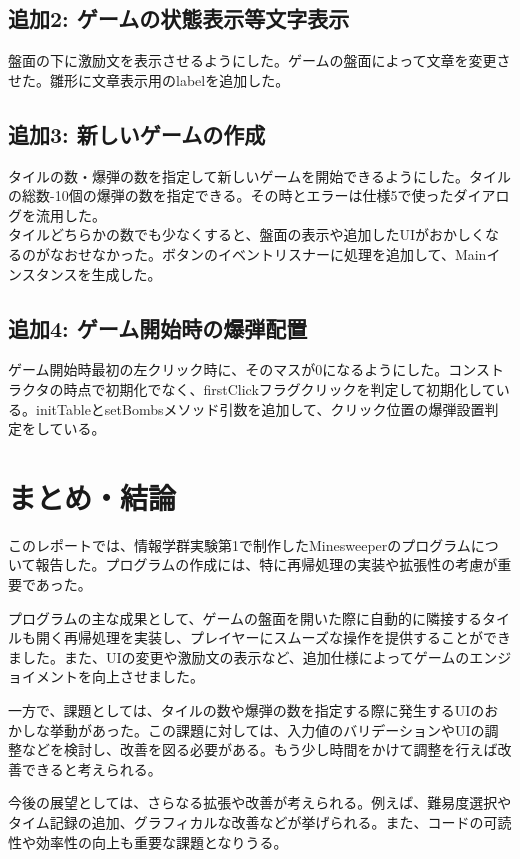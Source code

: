 \documentclass[a4j,12pt]{jsarticle}
\begin{document}
\subsection{追加2: ゲームの状態表示等文字表示}
盤面の下に激励文を表示させるようにした。ゲームの盤面によって文章を変更させた。雛形に文章表示用のlabelを追加した。

\subsection{追加3: 新しいゲームの作成}
タイルの数・爆弾の数を指定して新しいゲームを開始できるようにした。タイルの総数-10個の爆弾の数を指定できる。その時とエラーは仕様5で使ったダイアログを流用した。\\
タイルどちらかの数でも少なくすると、盤面の表示や追加したUIがおかしくなるのがなおせなかった。ボタンのイベントリスナーに処理を追加して、Mainインスタンスを生成した。

\subsection{追加4: ゲーム開始時の爆弾配置}
ゲーム開始時最初の左クリック時に、そのマスが0になるようにした。コンストラクタの時点で初期化でなく、firstClickフラグクリックを判定して初期化している。initTableとsetBombsメソッド引数を追加して、クリック位置の爆弾設置判定をしている。


\section{まとめ・結論}

このレポートでは、情報学群実験第1で制作したMinesweeperのプログラムについて報告した。プログラムの作成には、特に再帰処理の実装や拡張性の考慮が重要であった。

プログラムの主な成果として、ゲームの盤面を開いた際に自動的に隣接するタイルも開く再帰処理を実装し、プレイヤーにスムーズな操作を提供することができました。また、UIの変更や激励文の表示など、追加仕様によってゲームのエンジョイメントを向上させました。

一方で、課題としては、タイルの数や爆弾の数を指定する際に発生するUIのおかしな挙動があった。この課題に対しては、入力値のバリデーションやUIの調整などを検討し、改善を図る必要がある。もう少し時間をかけて調整を行えば改善できると考えられる。

今後の展望としては、さらなる拡張や改善が考えられる。例えば、難易度選択やタイム記録の追加、グラフィカルな改善などが挙げられる。また、コードの可読性や効率性の向上も重要な課題となりうる。
\end{document}
